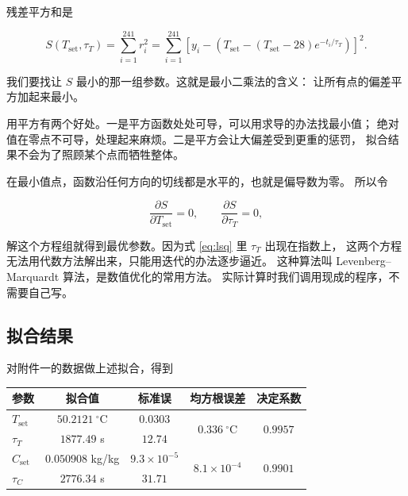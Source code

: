 残差平方和是

\begin{equation}
S(T_{\mathrm{set}},\tau_T)=\sum_{i=1}^{241} r_i^2
= \sum_{i=1}^{241}\left[y_i-\left(T_{\mathrm{set}}-\left(T_{\mathrm{set}}-28\right)e^{-t_i/\tau_T}\right)\right]^2 .
\label{eq:lsq}
\end{equation}

我们要找让 $S$ 最小的那一组参数。这就是最小二乘法的含义：
让所有点的偏差平方加起来最小。

用平方有两个好处。一是平方函数处处可导，可以用求导的办法找最小值；
绝对值在零点不可导，处理起来麻烦。二是平方会让大偏差受到更重的惩罚，
拟合结果不会为了照顾某个点而牺牲整体。

在最小值点，函数沿任何方向的切线都是水平的，也就是偏导数为零。
所以令

\begin{equation}
\frac{\partial S}{\partial T_{\mathrm{set}}}=0,\qquad
\frac{\partial S}{\partial \tau_T}=0,
\end{equation}

解这个方程组就得到最优参数。因为式 \eqref{eq:lsq} 里 $\tau_T$ 出现在指数上，
这两个方程无法用代数方法解出来，只能用迭代的办法逐步逼近。
这种算法叫 Levenberg–Marquardt 算法，是数值优化的常用方法。
实际计算时我们调用现成的程序，不需要自己写。

\subsection{拟合结果}

对附件一的数据做上述拟合，得到

\begin{center}
\begin{tabular}{@{}lcccc@{}}
\toprule
参数 & 拟合值 & 标准误 & 均方根误差 & 决定系数 \\
\midrule
$T_{\mathrm{set}}$ & $50.2121\ ^\circ$C & $0.0303$ & \multirow{2}{*}{$0.336\ ^\circ$C} & \multirow{2}{*}{$0.9957$} \\
$\tau_T$ & $1877.49$ s & $12.74$ & & \\
$C_{\mathrm{set}}$ & $0.050908$ kg/kg & $9.3\times10^{-5}$ & \multirow{2}{*}{$8.1\times10^{-4}$} & \multirow{2}{*}{$0.9901$} \\
$\tau_C$ & $2776.34$ s & $31.71$ & & \\
\bottomrule
\end{tabular}
\end{center}

